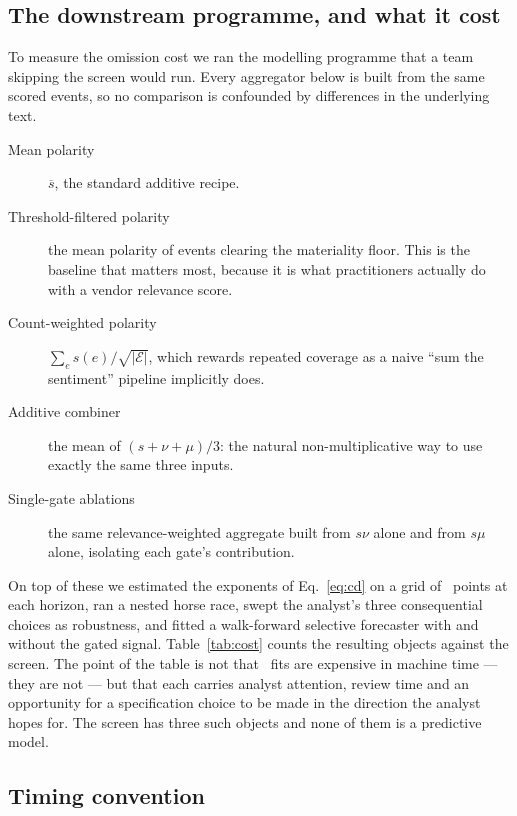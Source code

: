 \documentclass[preprint,12pt,authoryear]{elsarticle}
\theoremstyle{plain}
\theoremstyle{remark}
\begin{document}
\subsection{The downstream programme, and what it cost}\label{sec:programme}

To measure the omission cost we ran the modelling programme that a team
skipping the screen would run. Every aggregator below is built from the same
scored events, so no comparison is confounded by differences in the underlying
text.

\begin{description}
\item[Mean polarity] $\overline{s}$, the standard additive recipe.
\item[Threshold-filtered polarity] the mean polarity of events clearing the
  materiality floor. This is the baseline that matters most, because it is what
  practitioners actually do with a vendor relevance score.
\item[Count-weighted polarity] $\sum_e s(e)/\sqrt{|\mathcal{E}|}$, which rewards
  repeated coverage as a naive ``sum the sentiment'' pipeline implicitly does.
\item[Additive combiner] the mean of $(s+\nu+\mu)/3$: the natural
  non-multiplicative way to use exactly the same three inputs.
\item[Single-gate ablations] the same relevance-weighted aggregate built from
  $s\nu$ alone and from $s\mu$ alone, isolating each gate's contribution.
\end{description}

On top of these we estimated the exponents of Eq.~\eqref{eq:cd} on a grid of
\GridPerHorizon\ points at each horizon, ran a nested horse race, swept the
analyst's three consequential choices as robustness, and fitted a walk-forward
selective forecaster with and without the gated signal. Table~\ref{tab:cost}
counts the resulting objects against the screen. The point of the table is not
that \DownstreamTotal\ fits are expensive in machine time --- they are not ---
but that each carries analyst attention, review time and an opportunity for a
specification choice to be made in the direction the analyst hopes for. The
screen has three such objects and none of them is a predictive model.



\subsection{Timing convention}\label{sec:timing}
\end{document}
